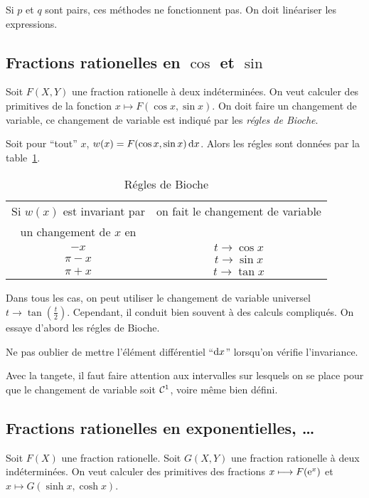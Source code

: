 Si \(p\) et \(q\) sont pairs, ces méthodes ne fonctionnent pas. On doit
linéariser les expressions.

\subsection{Fractions rationelles en \(\cos\) et \(\sin\)}

Soit \(F(X,Y)\) une fraction rationelle à deux indéterminées. On veut calculer
des primitives de la fonction \(x \longmapsto F(\cos x,\sin x)\). On doit faire
un changement de variable, ce changement de variable est indiqué par les
\emph{régles de Bioche}.

Soit pour ``tout'' \(x\), \(w(x) = F(\cos x,\sin x)\mathop{}\mathopen{}\mathrm{d} x\). Alors les régles
sont données par la table~\ref{tab:bioche}.
\begin{table}[!h]
  \centering
  \begin{tabular}{|c|c|}\hline
    Si \(w(x)\) est invariant par & on fait le changement de variable \\
    un changement de \(x\) en &  \\ \hline
    \(-x\) & \(t \to \cos x\)\\
    \(\pi-x\) & \(t \to \sin x\)\\
    \(\pi+x\) & \(t \to \tan x\)\\
  \hline\end{tabular}
  \caption{Régles de Bioche}
  \label{tab:bioche}
\end{table}

Dans tous les cas, on peut utiliser le changement de variable universel \(t \to
\tan\left(\frac{t}{2}\right)\). Cependant, il conduit bien souvent à des calculs
compliqués. On essaye d'abord les régles de Bioche.

\danger Ne pas oublier de mettre l'élément différentiel ``\(\mathop{}\mathopen{}\mathrm{d} x\)''
lorsqu'on vérifie l'invariance.

\danger Avec la tangete, il faut faire attention aux intervalles sur lesquels on
se place pour que le changement de variable soit \(\mathcal{C}^{1}\), voire même bien
défini.

\subsection{Fractions rationelles en exponentielles, \ldots}

Soit \(F(X)\) une fraction rationelle. Soit \(G(X,Y)\) une fraction rationelle à
deux indéterminées. On veut calculer des primitives des fractions \(x
\longmapsto F(\operatorname{e}^x)\) et \(x \longmapsto G(\sinh x,\cosh x)\).

